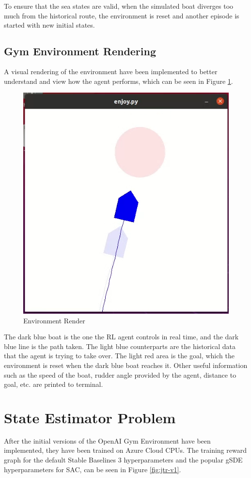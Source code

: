\documentclass[12pt,twoside]{report}
\begin{document}
To ensure that the sea states are valid, when the simulated boat diverges too much from the historical route, the environment is reset and another episode is started with new initial states.

\subsection{Gym Environment Rendering}
A visual rendering of the environment have been implemented to better understand and view how the agent performs, which can be seen in Figure \ref{fig:env-render}.

\begin{figure}[htbp]
\centering
\includegraphics[width = 0.5\hsize]{figures/rl-env/rendering.png}
\caption{Environment Render}
\label{fig:env-render}
\end{figure}

The dark blue boat is the one the RL agent controls in real time, and the dark blue line is the path taken. The light blue counterparts are the historical data that the agent is trying to take over. The light red area is the goal, which the environment is reset when the dark blue boat reaches it. Other useful information such as the speed of the boat, rudder angle provided by the agent, distance to goal, etc. are printed to terminal.

\section{State Estimator Problem}
After the initial versions of the OpenAI Gym Environment have been implemented, they have been trained on Azure Cloud CPUs. The training reward graph for the default Stable Baselines 3 hyperparameters and the popular gSDE hyperparameters for SAC, can be seen in Figure \ref{fig:jtr-v1}.
\end{document}
